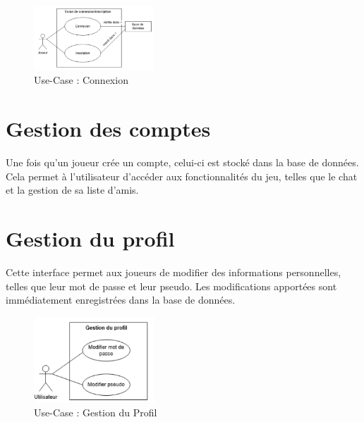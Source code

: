 \documentclass{report}
\begin{document}
\vspace{-1em}

\begin{figure}[H]
    \centering
     \includegraphics[width=0.4\textwidth, keepaspectratio]{src/design/connexion_design.png}
    \caption{Use-Case : Connexion}
    \label{fig:use_case_connexion_design}
\end{figure}

\section{Gestion des comptes}

\noindent Une fois qu’un joueur crée un compte, celui-ci est stocké dans la base de données. Cela permet à l'utilisateur d'accéder aux fonctionnalités du jeu, telles que le chat et la gestion de sa liste d'amis.


\section{Gestion du profil}

\noindent Cette interface permet aux joueurs de modifier des informations personnelles, telles que leur mot de passe et leur pseudo. Les modifications apportées sont immédiatement enregistrées dans la base de données.

\vspace{-1em}

\begin{figure}[H]
    \centering
     \includegraphics[width=0.4\textwidth, keepaspectratio]{src/design/user.png}
    \caption{Use-Case : Gestion du Profil}
    \label{fig:use_case_profil_managing_design}
\end{figure}
\end{document}
